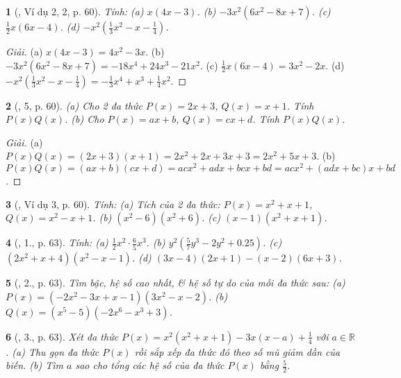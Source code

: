 \documentclass{article}
\newtheorem{baitoan}{}
\begin{document}
\begin{baitoan}[\cite{SGK_Toan_7_Canh_Dieu_tap_2}, Ví dụ 2, 2, p. 60]
	Tính: (a) $x(4x - 3)$. (b) $-3x^2(6x^2 - 8x + 7)$. (c) $\frac{1}{2}x(6x - 4)$. (d) $-x^2\left(\frac{1}{3}x^2 - x - \frac{1}{4}\right)$.
\end{baitoan}

\begin{proof}[Giải]
	(a) $x(4x - 3) = 4x^2 - 3x$. (b) $-3x^2(6x^2 - 8x + 7) = -18x^4 + 24x^3 - 21x^2$. (c) $\frac{1}{2}x(6x - 4) = 3x^2 - 2x$. (d) $-x^2\left(\frac{1}{3}x^2 - x - \frac{1}{4}\right) = -\frac{1}{3}x^4 + x^3 + \frac{1}{4}x^2$.
\end{proof}

\begin{baitoan}[\cite{SGK_Toan_7_Canh_Dieu_tap_2}, 5, p. 60]
	(a) Cho 2 đa thức $P(x) = 2x + 3$, $Q(x) = x + 1$. Tính $P(x)Q(x)$. (b) Cho $P(x) = ax + b$, $Q(x) = cx + d$. Tính $P(x)Q(x)$.
\end{baitoan}

\begin{proof}[Giải]
	(a) $P(x)Q(x) = (2x + 3)(x + 1) = 2x^2 + 2x + 3x + 3 = 2x^2 + 5x + 3$. (b) $P(x)Q(x) = (ax + b)(cx + d) = acx^2 + adx + bcx + bd = acx^2 + (adx + bc)x + bd$.
\end{proof}

\begin{baitoan}[\cite{SGK_Toan_7_Canh_Dieu_tap_2}, Ví dụ 3, p. 60]
	Tính: (a) Tích của 2 đa thức: $P(x) = x^2 + x + 1$, $Q(x) = x^2 - x + 1$. (b) $(x^2 - 6)(x^2 + 6)$. (c) $(x - 1)(x^2 + x + 1)$.
\end{baitoan}

\begin{baitoan}[\cite{SGK_Toan_7_Canh_Dieu_tap_2}, 1., p. 63]
	Tính: (a) $\frac{1}{2}x^2\cdot\frac{6}{5}x^3$. (b) $y^2\left(\frac{5}{7}y^3 - 2y^2 + 0.25\right)$. (c) $(2x^2 + x + 4)(x^2 - x - 1)$. (d) $(3x - 4)(2x + 1) - (x - 2)(6x + 3)$.
\end{baitoan}

\begin{baitoan}[\cite{SGK_Toan_7_Canh_Dieu_tap_2}, 2., p. 63]
	Tìm bậc, hệ số cao nhất, \& hệ số tự do của mỗi đa thức sau: (a) $P(x) = (-2x^2 - 3x + x - 1)(3x^2 - x - 2)$. (b) $Q(x) = (x^5 - 5)(-2x^6 - x^3 + 3)$.
\end{baitoan}

\begin{baitoan}[\cite{SGK_Toan_7_Canh_Dieu_tap_2}, 3., p. 63]
	Xét đa thức $P(x) = x^2(x^2 + x + 1) - 3x(x - a) + \frac{1}{4}$ với $a\in\mathbb{R}$. (a) Thu gọn đa thức $P(x)$ rồi sắp xếp đa thức đó theo số mũ giảm dần của biến. (b) Tìm $a$ sao cho tổng các hệ số của đa thức $P(x)$ bằng $\frac{5}{2}$.
\end{baitoan}
\end{document}

